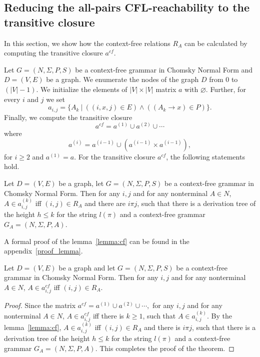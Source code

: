 \documentclass[runningheads,a4paper]{llncs}
\begin{document}
\subsection{Reducing the all-pairs CFL-reachability to the transitive closure} \label{section_reducing}
In this section, we show how the context-free relations $R_A$ can be calculated by computing the transitive closure $a^{cf}$.

Let $G = (N,\Sigma,P,S)$ be a context-free grammar in Chomsky Normal Form and $D = (V, E)$ be a graph. We enumerate the nodes of the graph $D$ from 0 to $(|V| - 1)$. We initialize the elements of $|V| \times |V|$ matrix $a$ with $\varnothing$. Further, for every $i$ and $j$ we set $$a_{i,j} = \{A_k~|~((i,x,j) \in E) \wedge ((A_k \rightarrow x) \in P)\}.$$ Finally, we compute the transitive closure $$a^{cf} = a^{(1)} \cup a^{(2)} \cup \cdots$$ where $$a^{(i)} = a^{(i-1)} \cup (a^{(i-1)} \times a^{(i-1)}),$$ for $i \ge 2$ and $a^{(1)} = a$. For the transitive closure $a^{cf}$, the following statements hold.

\begin{lemma}\label{lemma:cf}
	Let $D = (V,E)$ be a graph, let $G =(N,\Sigma,P,S)$ be a context-free grammar in Chomsky Normal Form. Then for any $i, j$ and for any nonterminal $A \in N$, $A \in a^{(k)}_{i,j}$ iff $(i,j) \in R_A$ and there are $i \pi j$, such that there is a derivation tree of the height $h \leq k$ for the string $l(\pi)$ and a context-free grammar $G_A = (N,\Sigma,P,A)$.
\end{lemma}

A formal proof of the lemma~\ref{lemma:cf} can be found in the appendix~\ref{proof_lemma}.

\begin{mytheorem}\label{thm:correct}
	Let $D = (V,E)$ be a graph and let $G =(N,\Sigma,P,S)$ be a context-free grammar in Chomsky Normal Form. Then for any $i, j$ and for any nonterminal $A \in N$, $A \in a^{cf}_{i,j}$ iff $(i,j) \in R_A$.
\end{mytheorem}
\begin{proof}
	
	Since the matrix $a^{cf} = a^{(1)} \cup a^{(2)} \cup \cdots,$ for any $i, j$ and for any nonterminal $A \in N$, $A \in a^{cf}_{i,j}$ iff there is $k \geq 1$, such that $A \in a^{(k)}_{i,j}$. By the lemma~\ref{lemma:cf}, $A \in a^{(k)}_{i,j}$ iff $(i,j) \in R_A$ and there is $i \pi j$, such that there is a derivation tree of the height $h \leq k$ for the string $l(\pi)$ and a context-free grammar $G_A = (N,\Sigma,P,A)$. This completes the proof of the theorem.
\end{proof}
\end{document}
